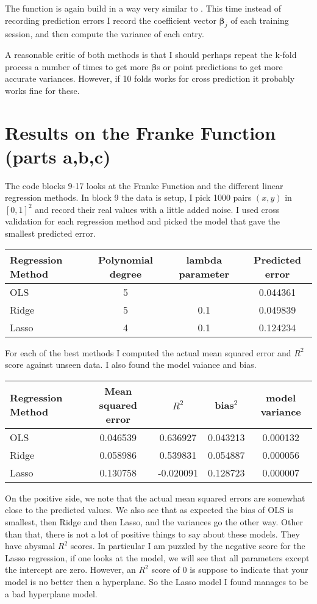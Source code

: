 \documentclass[parskip=half]{scrartcl}
\theoremstyle{definition}
\theoremstyle{remark}
\newcommand{\vect}[1]{{\bm{#1}}}
\newcommand{\funcname}[1]{{\color{blue}{\texttt{#1}}}}
\begin{document}
The function \funcname{beta\_variance} is again build in a way very similar to \funcname{cross\_validation}. 
This time instead of recording prediction errors I record the coefficient vector $\vect{\beta}_j$ of each training session, and then compute the variance of each entry. 

A reasonable critic of both methods is that I should perhaps repeat the k-fold process a number of times to get more $\vect{\beta}$s or point predictions to get more accurate variances.
However, if 10 folds works for cross prediction it probably works fine for these.

\section{Results on the Franke Function (parts a,b,c)}

The code blocks 9-17 looks at the Franke Function and the different linear regression methods. 
In block 9 the data is setup, I pick 1000 pairs $(x,y)$ in $[0,1]^2$ and record their real values with a little added noise. 
I used cross validation for each regression method and picked the model that gave the smallest predicted error.

\begin{tabular}{l|ccc}
Regression Method & Polynomial degree & lambda parameter & Predicted error \\ 
\hline
\hline 
OLS & 5 &  & 0.044361 \\ 
Ridge & 5 & 0.1 & 0.049839 \\ 
Lasso & 4 & 0.1 & 0.124234
\end{tabular} 

For each of the best methods I computed the actual mean squared error and $R^2$ score against unseen data. 
I also found the model vaiance and bias.

\begin{tabular}{l|cccc}
Regression Method & Mean squared error & $R^2$ & bias$^2$ & model variance  \\ 
\hline
\hline 
OLS &  0.046539 & 0.636927 & 0.043213 & 0.000132 \\ 
Ridge & 0.058986 & 0.539831 & 0.054887 & 0.000056 \\ 
Lasso & 0.130758 & -0.020091 & 0.128723 & 0.000007
\end{tabular} 

On the positive side, we note that the actual mean squared errors are somewhat close to the predicted values.
We also see that as expected the bias of OLS is smallest, then Ridge and then Lasso, and the variances go the other way.    
Other than that, there is not a lot of positive things to say about these models. 
They have abysmal $R^2$ scores.
In particular I am puzzled by the negative score for the Lasso regression, if one looks at the model, we will see that all parameters except the intercept are zero. 
However, an $R^2$ score of $0$ is suppose to indicate that your model is no better then a hyperplane. 
So the Lasso model I found manages to be a bad hyperplane model.  
\end{document}
